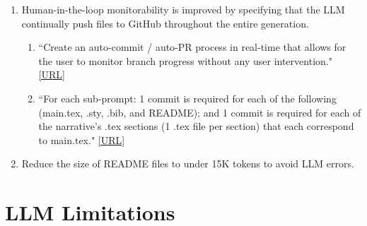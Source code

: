 \documentclass{article}
\begin{document}
\begin{enumerate}
\begin{enumerate}
    \item “Update other relevant documentation such as project structures, the main README diagrams, repository structure, etc. Update the CHANGELOG.md (v4.1.0)." \href{https://github.com/kevinkawchak/physical-ai-oncology-trials/blob/main/trial-phase-2/prompts/prompt-protocol.md}{[URL]}\cite{2026Ph2Darax}
    \item “There must be a single last v0.1.0 update that provides the main directory CHANGELOG.md, releases.md, repository updates, (as inspired by kevinkawchak/cancer-automated, but with 3x as many relevant main readme badges)." \href{https://github.com/kevinkawchak/law-physical-ai-trials/blob/main/review/prompts/prompt-narrative.md}{[URL]}\cite{2026HR9510FL}
\end{enumerate}
\item Human-in-the-loop monitorability is improved by specifying that the LLM continually push files to GitHub throughout the entire generation.  
\begin{enumerate}
    \item “Create an auto-commit / auto-PR process in real-time that allows for the user to monitor branch progress without any user intervention." \href{https://github.com/kevinkawchak/physical-ai-oncology-trials/blob/main/trial-protocol/prompts/prompt-protocol.md}{[URL]}\cite{2026OnPremis}
    \item “For each sub-prompt: 1 commit is required for each of the following (main.tex, .sty, .bib, and README); and 1 commit is required for each of the narrative's .tex sections (1 .tex file per section) that each correspond to main.tex." \href{https://github.com/kevinkawchak/physical-ai-oncology-trials/blob/main/trial-protocol/prompts/prompt-protocol.md}{[URL]}\cite{2026OnPremis}
\end{enumerate}
\item Reduce the size of README files to under 15K tokens to avoid LLM errors.
\end{enumerate}





\section{LLM Limitations}
\end{document}
